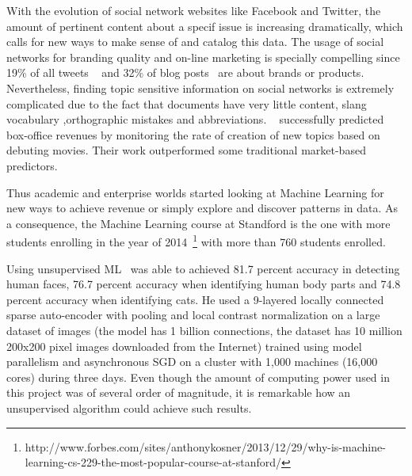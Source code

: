 With the evolution of social network websites like Facebook and Twitter, the amount of pertinent content about a specif issue is increasing dramatically, which calls for new ways to make sense of and catalog this data.
The usage of social networks for branding quality and on-line marketing is specially compelling since 19\% of all tweets ~\cite{Jansen2009} and 32\% of blog posts~\cite{Melville2009} are about brands or products. Nevertheless, finding topic sensitive information on social networks is extremely complicated due to the fact that documents have very little content, slang vocabulary ,orthographic mistakes and abbreviations. ~\citet{Asur2010} successfully predicted box-office revenues by monitoring the rate of creation of new topics based on debuting movies. Their work outperformed some traditional market-based predictors.

Thus academic and enterprise worlds started looking at Machine Learning for new ways to achieve revenue or simply explore and discover patterns in data. 
As a consequence, the Machine Learning course at Standford is the one with more students enrolling in the year of 2014~\footnote{http://www.forbes.com/sites/anthonykosner/2013/12/29/why-is-machine-learning-cs-229-the-most-popular-course-at-stanford/} with more than 760 students enrolled.

Using unsupervised \ac{ML}~\citet{Le2011} was able to achieved 81.7 percent accuracy in detecting human faces, 76.7 percent accuracy when identifying human body parts and 74.8 percent accuracy when identifying cats. He used a 9-layered locally connected sparse auto-encoder with pooling and local contrast normalization on a large dataset of images (the model has 1 billion connections, the dataset has 10 million 200x200 pixel images downloaded from the Internet) trained using model parallelism and asynchronous SGD on a cluster with 1,000 machines (16,000 cores) during three days. Even though the amount of computing power used in this project was of several order of magnitude, it is remarkable how an unsupervised algorithm could achieve such results.

